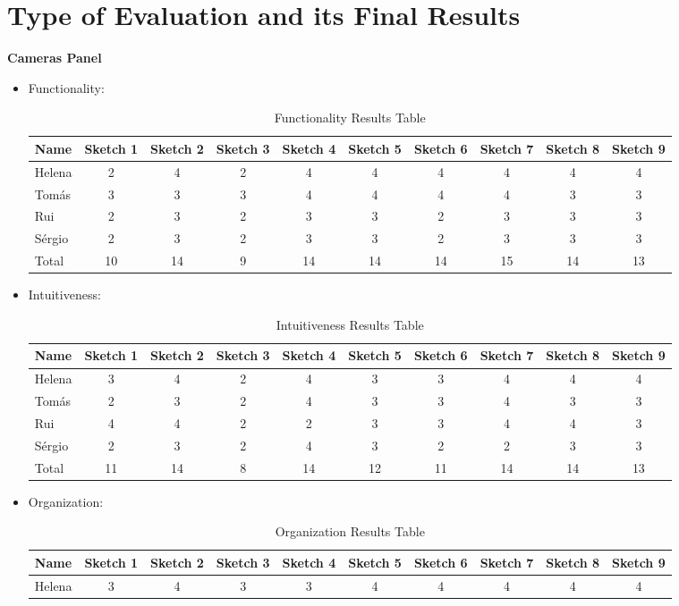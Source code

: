 \section{Type of Evaluation and its Final Results}
\textbf{Cameras Panel}
\begin{itemize}
    \item Functionality: 
\begin{table}[H]
\caption{Functionality Results Table}
\begin{tabular}{l*{9}{c}}
Name & Sketch 1 & Sketch 2 & Sketch 3 & Sketch 4 
& Sketch 5 & Sketch 6 & Sketch 7 & Sketch 8 & Sketch 9 \\
\hline 
Helena & 2 & 4 & 2 & 4 & 4 & 4 & 4 & 4 & 4 \\
Tomás & 3 & 3 & 3 & 4 & 4 & 4 & 4 & 3 & 3 \\ 
Rui & 2 & 3 & 2 & 3 & 3 & 2 & 3 & 3 & 3 \\ 
Sérgio & 2 & 3 & 2 & 3 & 3 & 2 & 3 & 3 & 3 \\ 
Total & 10 & 14 & 9 & 14 & 14 & 14 & 15 & 14 & 13 \\
\end{tabular}
\end{table}
\item Intuitiveness: 
\begin{table}[H]
\caption{Intuitiveness Results Table}
\begin{tabular}{l*{9}{c}}
    Name & Sketch 1 & Sketch 2 & Sketch 3 & Sketch 4 
    & Sketch 5 & Sketch 6 & Sketch 7 & Sketch 8 & Sketch 9 \\
    \hline 
    Helena & 3 & 4 & 2 & 4 & 3 & 3 & 4 & 4 & 4 \\
    Tomás & 2 & 3 & 2 & 4 & 3 & 3 & 4 & 3 & 3 \\ 
    Rui & 4 & 4 & 2 & 2 & 3 & 3 & 4 & 4 & 3 \\ 
    Sérgio & 2 & 3 & 2 & 4 & 3 & 2 & 2 & 3 & 3 \\ 
    Total & 11 & 14 & 8 & 14 & 12 & 11 & 14 & 14 & 13 \\
\end{tabular}
\end{table}
\item Organization:
\begin{table}[H]
    \caption{Organization Results Table}
    \begin{tabular}{l*{9}{c}}
        Name & Sketch 1 & Sketch 2 & Sketch 3 & Sketch 4 
        & Sketch 5 & Sketch 6 & Sketch 7 & Sketch 8 & Sketch 9 \\
        \hline 
        Helena & 3 & 4 & 3 & 3 & 4 & 4 & 4 & 4 & 4 \\

\end{tabular}
\end{table}
\end{itemize}
